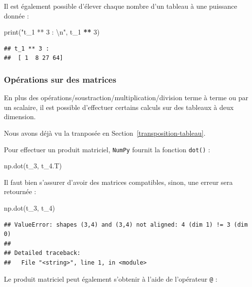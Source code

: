 \documentclass[12pt,]{book}
\newenvironment{Shaded}{\begin{snugshade}}{\end{snugshade}}
\newcommand{\DecValTok}[1]{\textcolor[rgb]{0.00,0.00,0.81}{#1}}
\newcommand{\CharTok}[1]{\textcolor[rgb]{0.31,0.60,0.02}{#1}}
\newcommand{\StringTok}[1]{\textcolor[rgb]{0.31,0.60,0.02}{#1}}
\newcommand{\OperatorTok}[1]{\textcolor[rgb]{0.81,0.36,0.00}{\textbf{#1}}}
\newcommand{\BuiltInTok}[1]{#1}
\newcommand{\NormalTok}[1]{#1}
\numberwithin{equation}{section}
\numberwithin{countremarque}{section}
\begin{document}
Il est également possible d'élever chaque nombre d'un tableau à une
puissance donnée :

\begin{Shaded}
\begin{Highlighting}[]
\BuiltInTok{print}\NormalTok{(}\StringTok{"t_1 ** 3 : }\CharTok{\textbackslash{}n}\StringTok{"}\NormalTok{, t_1 }\OperatorTok{**} \DecValTok{3}\NormalTok{)}
\end{Highlighting}
\end{Shaded}

\begin{lstlisting}
## t_1 ** 3 : 
##  [ 1  8 27 64]
\end{lstlisting}

\subsubsection{Opérations sur des
matrices}\label{operations-sur-des-matrices}

En plus des opérations/soustraction/multiplication/division terme à
terme ou par un scalaire, il est possible d'effectuer certains calculs
sur des tableaux à deux dimension.

Nous avons déjà vu la tranposée en Section~\ref{transposition-tableau}.

Pour effectuer un produit matriciel, \texttt{NumPy} fournit la fonction
\texttt{dot()} :

\begin{Shaded}
\begin{Highlighting}[]
\NormalTok{np.dot(t_3, t_4.T)}
\end{Highlighting}
\end{Shaded}

Il faut bien s'assurer d'avoir des matrices compatibles, sinon, une
erreur sera retournée :

\begin{Shaded}
\begin{Highlighting}[]
\NormalTok{np.dot(t_3, t_4)}
\end{Highlighting}
\end{Shaded}

\begin{lstlisting}
## ValueError: shapes (3,4) and (3,4) not aligned: 4 (dim 1) != 3 (dim 0)
## 
## Detailed traceback: 
##   File "<string>", line 1, in <module>
\end{lstlisting}

Le produit matriciel peut également s'obtenir à l'aide de l'opérateur
\texttt{@} :
\end{document}
